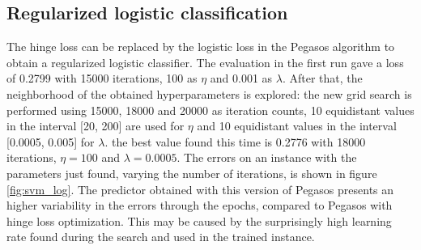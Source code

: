 \documentclass{article}
\begin{document}
\subsection{Regularized logistic classification}
The hinge loss can be replaced by the logistic loss in the Pegasos algorithm to obtain a regularized logistic classifier. The evaluation in the first run gave a loss of 0.2799 with 15000 iterations, 100 as $\eta$ and 0.001 as $\lambda$. After that, the neighborhood of the obtained hyperparameters is explored: the new grid search is performed using 15000, 18000 and 20000 as iteration counts, 10 equidistant values in the interval [20, 200] are used for $\eta$ and 10 equidistant values in the interval [0.0005, 0.005] for $\lambda$. the best value found this time is 0.2776 with 18000 iterations, $\eta=100$ and $\lambda=0.0005 $. The errors on an instance with the parameters just found, varying the number of iterations, is shown in figure \ref{fig:svm_log}. The predictor obtained with this version of Pegasos presents an higher variability in the errors through the epochs, compared to Pegasos with hinge loss optimization. This may be caused by the surprisingly high learning rate found during the search and used in the trained instance.
\end{document}
